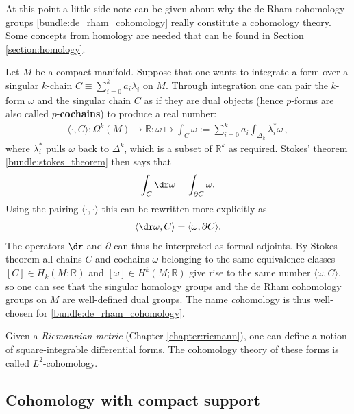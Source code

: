     At this point a little side note can be given about why the de Rham cohomology groups \ref{bundle:de_rham_cohomology} really constitute a cohomology theory. Some concepts from homology are needed that can be found in Section \ref{section:homology}.

    Let $M$ be a compact manifold. Suppose that one wants to integrate a form over a singular $k$-chain $C\equiv\sum_{i=0}^ka_i\lambda_i$ on $M$. Through integration one can pair the $k$-form $\omega$ and the singular chain $C$ as if they are dual objects (hence $p$-forms are also called $p$-\textbf{cochains}) to produce a real number:
    \begin{gather}
        \langle\cdot,C\rangle:\Omega^k(M)\rightarrow\mathbb{R}:\omega\mapsto\int_C\omega := \sum_{i=0}^ka_i\int_{\Delta_k}\lambda_i^*\omega\,,
    \end{gather}
    where $\lambda_i^*$ pulls $\omega$ back to $\Delta^k$, which is a subset of $\mathbb{R}^k$ as required. Stokes' theorem \ref{bundle:stokes_theorem} then says that
    \begin{gather}
        \int_C\dr\omega = \int_{\partial C}\omega.
    \end{gather}
    Using the pairing $\langle\cdot,\cdot\rangle$ this can be rewritten more explicitly as
    \begin{gather}
        \langle\dr\omega,C \rangle = \langle\omega,\partial C\rangle.
    \end{gather}
    The operators $\dr$ and $\partial$ can thus be interpreted as formal adjoints. By Stokes theorem all chains $C$ and cochains $\omega$ belonging to the same equivalence classes $[C]\in H_k(M;\mathbb{R})$ and $[\omega]\in H^k(M;\mathbb{R})$ give rise to the same number $\langle\omega,C\rangle$, so one can see that the singular homology groups and the de Rham cohomology groups on $M$ are well-defined dual groups. The name \textit{co}homology is thus well-chosen for \ref{bundle:de_rham_cohomology}.

    \begin{remark}[$L^2$-cohomology]
        Given a \textit{Riemannian metric} (Chapter \ref{chapter:riemann}), one can define a notion of square-integrable differential forms. The cohomology theory of these forms is called $L^2$-cohomology.
    \end{remark}

\subsection{Cohomology with compact support}\label{section:compact_cohomology}

